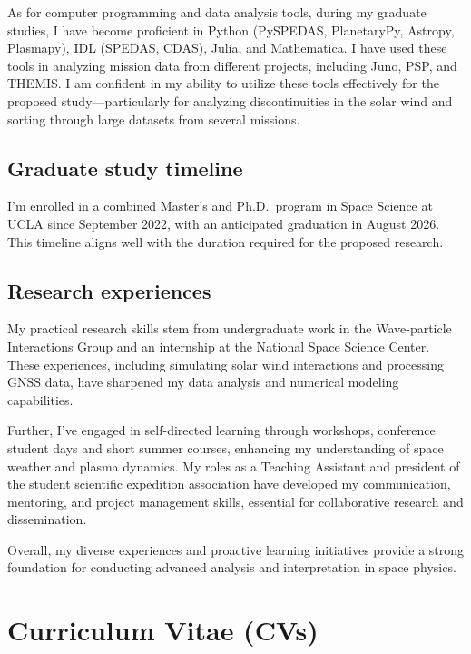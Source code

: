 \documentclass[
  letterpaper,
  DIV=11,
  numbers=noendperiod]{scrartcl}
\begin{document}
As for computer programming and data analysis tools, during my graduate
studies, I have become proficient in Python (PySPEDAS, PlanetaryPy,
Astropy, Plasmapy), IDL (SPEDAS, CDAS), Julia, and Mathematica. I have
used these tools in analyzing mission data from different projects,
including Juno, PSP, and THEMIS. I am confident in my ability to utilize
these tools effectively for the proposed study---particularly for
analyzing discontinuities in the solar wind and sorting through large
datasets from several missions.

\subsection{Graduate study timeline}\label{graduate-study-timeline}

I'm enrolled in a combined Master's and Ph.D.~program in Space Science
at UCLA since September 2022, with an anticipated graduation in August
2026. This timeline aligns well with the duration required for the
proposed research.

\subsection{Research experiences}\label{research-experiences}

My practical research skills stem from undergraduate work in the
Wave-particle Interactions Group and an internship at the National Space
Science Center. These experiences, including simulating solar wind
interactions and processing GNSS data, have sharpened my data analysis
and numerical modeling capabilities.

Further, I've engaged in self-directed learning through workshops,
conference student days and short summer courses, enhancing my
understanding of space weather and plasma dynamics. My roles as a
Teaching Assistant and president of the student scientific expedition
association have developed my communication, mentoring, and project
management skills, essential for collaborative research and
dissemination.

Overall, my diverse experiences and proactive learning initiatives
provide a strong foundation for conducting advanced analysis and
interpretation in space physics.

\newpage{}

\section{Curriculum Vitae (CVs)}\label{curriculum-vitae-cvs}
\end{document}
